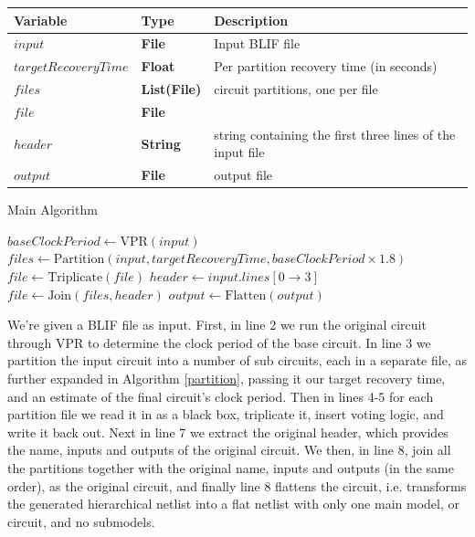 \documentclass[12pt,final,oneside,a4paper]{dwThesis} %
\begin{document}
   \begin{algorithm}

      \begin{center}

         \begin{tabular}
            {lll} \toprule Variable &
            Type & Description\\
            \midrule $input$ & \textbf{File} &  Input \gls{BLIF}
            file\\
            $targetRecoveryTime$ & \textbf{Float} &  Per partition
            recovery time (in seconds) \\
            $files$ & \textbf{List(File)} &
            circuit partitions, one per file \\
            $file$ & \textbf{File} &  \\

            $header$ & \textbf{String} &  string containing the first three
            lines of the input file \\
            $output$ & \textbf{File} &  output
            file\\
            \bottomrule 
         \end{tabular}

      \end{center}
      \caption{Main
         Algorithm}\label{main} 
      \begin{algorithmic}[1]
         \State $baseClockPeriod \gets $VPR$(input)$
         \State $files \gets
         \mbox{Partition}(input, targetRecoveryTime, baseClockPeriod\times1.8)$  
         \State $file \gets \mbox{Triplicate}(file)$ \EndFor 
         \State
         $header \gets input.lines[0\to 3]$ 
         \State $file \gets
         \mbox{Join}(files, header)$ 
         \State $output \gets
         \mbox{Flatten}(output)$ \EndProcedure 
      \end{algorithmic}


   \end{algorithm}
   We're given a \gls{BLIF} file as input.
   First, in line 2 we run the original circuit through \gls{VPR} to determine the clock period of the base circuit.
   In line 3 we partition the input circuit into a number of sub circuits, each in a separate file, as
   further expanded in Algorithm \ref{partition}, passing it our target recovery time, and an estimate of the final circuit's clock period.
   Then in lines 4-5 for each
   partition file we read it in as a black box, triplicate it, insert voting
   logic, and write it back out.  Next in line 7 we extract the original
   header, which provides the name, inputs and outputs of the original circuit.
   We then, in line 8, join all the partitions together with the original name,
   inputs and outputs (in the same order), as the original circuit, and finally
   line 8 flattens the circuit, i.e. transforms the generated hierarchical
   netlist into a flat netlist with only one main model, or circuit, and no
   submodels.
\end{document}
